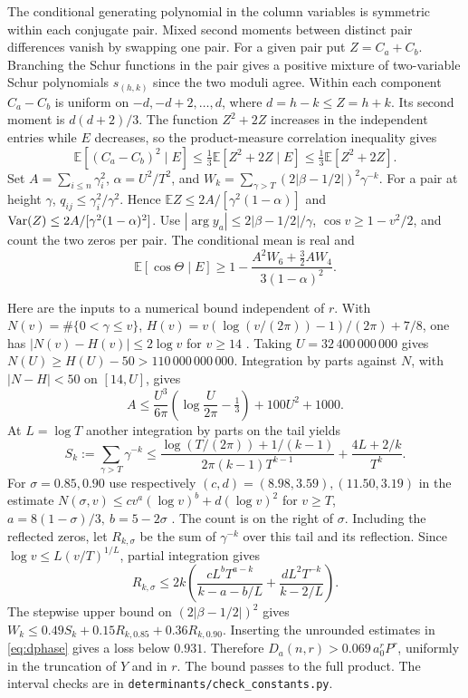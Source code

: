 \documentclass[11pt,a4paper,reqno]{amsart}
\numberwithin{equation}{section}
\begin{document}
The conditional generating polynomial in the column variables is symmetric within each conjugate pair. Mixed second moments between distinct pair differences vanish by swapping one pair. For a given pair put \(Z=C_a+C_b\). Branching the Schur functions in the pair gives a positive mixture of two-variable Schur polynomials \(s_{(h,k)}\) since the two moduli agree. Within each component \(C_a-C_b\) is uniform on \(-d,-d+2,\dots,d\), where \(d=h-k\le Z=h+k\). Its second moment is \(d(d+2)/3\). The function \(Z^2+2Z\) increases in the independent entries while \(E\) decreases, so the product-measure correlation inequality gives
\[
 \mathbb E[(C_a-C_b)^2\mid E]\le \tfrac13\mathbb E[Z^2+2Z\mid E]\le\tfrac13\mathbb E[Z^2+2Z].
\]
Set \(A=\sum_{i\le n}\gamma_i^2\), \(\alpha=U^2/T^2\), and \(W_k=\sum_{\gamma>T}(2|\beta-1/2|)^2\gamma^{-k}\). For a pair at height \(\gamma\), \(q_{ij}\le\gamma_i^2/\gamma^2\). Hence \(\mathbb EZ\le2A/[\gamma^2(1-\alpha)]\) and \({\rm Var}(Z)\le2A/[\gamma^2(1-\alpha)^2]\). Use \(|\arg y_a|\le2|\beta-1/2|/\gamma\), \(\cos v\ge1-v^2/2\), and count the two zeros per pair. The conditional mean is real and
\begin{equation}\label{eq:dphase}
 \mathbb E[\cos\Theta\mid E]\ge1-\frac{A^2W_6+\tfrac32 A W_4}{3(1-\alpha)^2}.
\end{equation}

Here are the inputs to a numerical bound independent of \(r\). With \(N(v)=\#\{0<\gamma\le v\}\), \(H(v)=v(\log(v/(2\pi))-1)/(2\pi)+7/8\), one has \(|N(v)-H(v)|\le2\log v\) for \(v\ge14\) \cite[(3)]{dusart}. Taking \(U=32\,400\,000\,000\) gives \(N(U)\ge H(U)-50>110\,000\,000\,000\). Integration by parts against \(N\), with \(|N-H|<50\) on \([14,U]\), gives
\[
 A\le\frac{U^3}{6\pi}\left(\log\frac{U}{2\pi}-\tfrac13\right)+100U^2+1000 .
\]
At \(L=\log T\) another integration by parts on the tail yields
\[
 S_k:=\sum_{\gamma>T}\gamma^{-k}\le
 \frac{\log(T/(2\pi))+1/(k-1)}{2\pi(k-1)T^{k-1}}+
 \frac{4L+2/k}{T^k}.
\]
For \(\sigma=0.85,0.90\) use respectively \((c,d)=(8.98,3.59),(11.50,3.19)\) in the estimate \(N(\sigma,v)\le c v^a(\log v)^b+d(\log v)^2\) for \(v\ge T\), \(a=8(1-\sigma)/3,\ b=5-2\sigma\) \cite[Table~1 and (4.71)]{kln}. The count is on the right of \(\sigma\). Including the reflected zeros, let \(R_{k,\sigma}\) be the sum of \(\gamma^{-k}\) over this tail and its reflection. Since \(\log v\le L(v/T)^{1/L}\), partial integration gives
\[
 R_{k,\sigma}\le 2k\left(
 \frac{cL^b T^{a-k}}{k-a-b/L}+\frac{dL^2T^{-k}}{k-2/L}\right).
\]
The stepwise upper bound on \((2|\beta-1/2|)^2\) gives \(W_k\le0.49S_k+0.15R_{k,0.85}+0.36R_{k,0.90}\). Inserting the unrounded estimates in \eqref{eq:dphase} gives a loss below \(0.931\). Therefore \(D_a(n,r)>0.069\,a_0^r P^r\), uniformly in the truncation of \(Y\) and in \(r\). The bound passes to the full product. The interval checks are in \texttt{determinants/check\_constants.py}.
\end{document}
